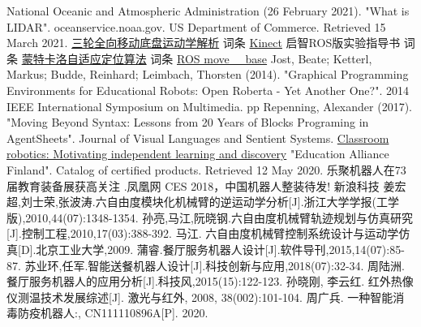 \documentclass[11pt]{article}
\begin{document}
\begin{thebibliography}{99} 
    National Oceanic and Atmospheric Administration (26 February 2021). "What is LIDAR". oceanservice.noaa.gov. US Department of Commerce. Retrieved 15 March 2021.
    \href{https://blog.csdn.net/ycy_dy/article/details/78353894}{三轮全向移动底盘运动学解析}
    词条 \href{https://en.wikipedia.org/wiki/Kinect}{Kinect}
    启智ROS版实验指导书
    词条 \href{http://wiki.ros.org/amcl}{蒙特卡洛自适应定位算法}
    词条 \href{http://wiki.ros.org/move_base/move_base-1}{ROS move \_ base}
     Jost, Beate; Ketterl, Markus; Budde, Reinhard; Leimbach, Thorsten (2014). "Graphical Programming Environments for Educational Robots:
    Open Roberta - Yet Another One?". 2014 IEEE International Symposium on Multimedia. pp
    Repenning, Alexander (2017). "Moving Beyond Syntax: Lessons from 20 Years of Blocks Programing in AgentSheets". Journal of Visual
    Languages and Sentient Systems.
     \href{https://robohub.org/classroom-robotics-motivating-independent-lear
    ning-and-discovery/}{Classroom robotics: Motivating independent learning and discovery}
    "Education Alliance Finland". Catalog of certified products. Retrieved 12 May 2020.
    乐聚机器人在73届教育装备展获高关注 .凤凰网
    CES 2018，中国机器人整装待发! 新浪科技
    姜宏超,刘士荣,张波涛.六自由度模块化机械臂的逆运动学分析[J].浙江大学学报(工学版),2010,44(07):1348-1354.
    孙亮,马江,阮晓钢.六自由度机械臂轨迹规划与仿真研究[J].控制工程,2010,17(03):388-392.
    马江. 六自由度机械臂控制系统设计与运动学仿真[D].北京工业大学,2009.
    蒲睿.餐厅服务机器人设计[J].软件导刊,2015,14(07):85-87.
    苏业环,任军.智能送餐机器人设计[J].科技创新与应用,2018(07):32-34.
    周陆洲.餐厅服务机器人的应用分析[J].科技风,2015(15):122-123.
    孙晓刚, 李云红. 红外热像仪测温技术发展综述[J]. 激光与红外, 2008, 38(002):101-104.
    周广兵. 一种智能消毒防疫机器人:, CN111110896A[P]. 2020.
\end{thebibliography}
\end{document}
